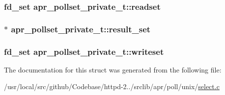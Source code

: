 \subsubsection[{\texorpdfstring{readset}{readset}}]{\setlength{\rightskip}{0pt plus 5cm}fd\+\_\+set apr\+\_\+pollset\+\_\+private\+\_\+t\+::readset}\hypertarget{structapr__pollset__private__t_af8a836217a363e720b9aa67eb7818fd7}{}\label{structapr__pollset__private__t_af8a836217a363e720b9aa67eb7818fd7}
\subsubsection[{\texorpdfstring{result\+\_\+set}{result_set}}]{$\ast$ apr\+\_\+pollset\+\_\+private\+\_\+t\+::result\+\_\+set}\hypertarget{structapr__pollset__private__t_a299df5c2a80805ce10080a7dc24b7717}{}\label{structapr__pollset__private__t_a299df5c2a80805ce10080a7dc24b7717}
\subsubsection[{\texorpdfstring{writeset}{writeset}}]{\setlength{\rightskip}{0pt plus 5cm}fd\+\_\+set apr\+\_\+pollset\+\_\+private\+\_\+t\+::writeset}\hypertarget{structapr__pollset__private__t_a2d2a3e11cb99f05bc27d8fab814c3d51}{}\label{structapr__pollset__private__t_a2d2a3e11cb99f05bc27d8fab814c3d51}


The documentation for this struct was generated from the following file\+:\begin{DoxyCompactItemize}
\item 
/usr/local/src/github/\+Codebase/httpd-\/2../srclib/apr/poll/unix/\hyperlink{select_8c}{select.\+c}\end{DoxyCompactItemize}
